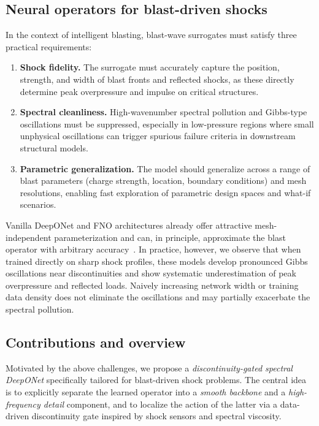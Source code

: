\documentclass[a4paper,fleqn]{cas-dc}
\begin{document}
\subsection{Neural operators for blast-driven shocks}

In the context of intelligent blasting, blast-wave surrogates must satisfy three practical requirements:

\begin{enumerate}[label=(R\arabic*),leftmargin=*]
  \item \textbf{Shock fidelity.} The surrogate must accurately capture the position, strength, and width of blast fronts and reflected shocks, as these directly determine peak overpressure and impulse on critical structures.
  \item \textbf{Spectral cleanliness.} High-wavenumber spectral pollution and Gibbs-type oscillations must be suppressed, especially in low-pressure regions where small unphysical oscillations can trigger spurious failure criteria in downstream structural models.
  \item \textbf{Parametric generalization.} The model should generalize across a range of blast parameters (charge strength, location, boundary conditions) and mesh resolutions, enabling fast exploration of parametric design spaces and what-if scenarios.
\end{enumerate}

Vanilla DeepONet and FNO architectures already offer attractive mesh-independent parameterization and can, in principle, approximate the blast operator with arbitrary accuracy~\citep{Lu2021DeepONet,Li2021FNO,Kovachki2023NeuralOperator}.
In practice, however, we observe that when trained directly on sharp shock profiles, these models develop pronounced Gibbs oscillations near discontinuities and show systematic underestimation of peak overpressure and reflected loads.
Naively increasing network width or training data density does not eliminate the oscillations and may partially exacerbate the spectral pollution.

\subsection{Contributions and overview}

Motivated by the above challenges, we propose a \emph{discontinuity-gated spectral DeepONet} specifically tailored for blast-driven shock problems.
The central idea is to explicitly separate the learned operator into a \emph{smooth backbone} and a \emph{high-frequency detail} component, and to localize the action of the latter via a data-driven discontinuity gate inspired by shock sensors and spectral viscosity.
\end{document}
